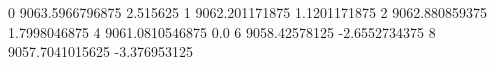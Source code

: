 0 9063.5966796875 2.515625
1 9062.201171875 1.1201171875
2 9062.880859375 1.7998046875
4 9061.0810546875 0.0
6 9058.42578125 -2.6552734375
8 9057.7041015625 -3.376953125
